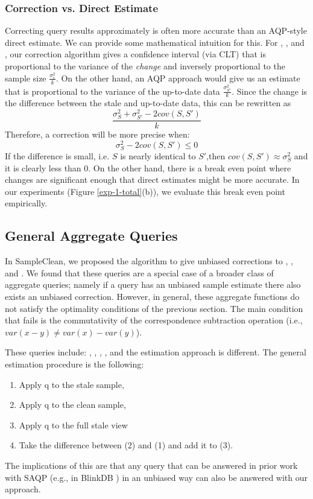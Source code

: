 \subsubsection{Correction vs. Direct Estimate}
Correcting query results approximately is often more accurate than an AQP-style direct estimate. 
We can provide some mathematical intuition for this.
For \sumfunc, \countfunc, and \avgfunc, our correction algorithm gives a confidence interval (via CLT) that is
proportional to the variance of the \emph{change} and inversely proportional to the sample size 
$\frac{\sigma_{c}^2}{k}$.
On the other hand, an AQP approach would give us an estimate that is proportional to the variance of the up-to-date data 
$\frac{\sigma_{S'}^2}{k}$.
Since the change is the difference between the stale and up-to-date data, this can be rewritten as
\[\frac{\sigma_{S}^2 + \sigma_{S'}^2 - 2cov(S,S')}{k}\]
Therefore, a correction will be more precise when:
\[\sigma_{S}^2 - 2cov(S,S') \le 0 \]
If the difference is small, i.e. $S$ is nearly identical to $S'$,then $cov(S,S') \approx \sigma_{S}^2$ and it is clearly less than 0. 
On the other hand, there is a break even point where changes are significant enough that direct estimates might be more accurate.
In our experiments (Figure \ref{exp-1-total}(b)), we evaluate this break even point empirically. 

\subsection{General Aggregate Queries}
In SampleClean, we proposed the \nsc algorithm to give unbiased corrections to \sumfunc, \countfunc, and \avgfunc.
We found that these queries are a special case of a broader class of aggregate queries; namely if a query has an unbiased sample estimate there also exists an unbiased correction.
However, in general, these aggregate functions do not satisfy the optimality conditions of the previous section.
The main condition that fails is the commutativity of the correspondence subtraction operation (i.e., $var(x-y) \ne var(x) - var(y)$).

These queries include: \histfunc, \corrfunc, \varfunc, \covfunc, and the estimation approach is different.
The general estimation procedure is the following:
\begin{enumerate}[noitemsep]
\item Apply q to the stale sample, 
\item Apply q to the clean sample, 
\item Apply q to the full stale view
\item Take the difference between (2) and (1) and add it to (3).
\end{enumerate}
The implications of this are that any query that can be answered in prior work with SAQP (e.g., in BlinkDB \cite{AgarwalMPMMS13}) in an unbiased way can also be answered with our approach.

